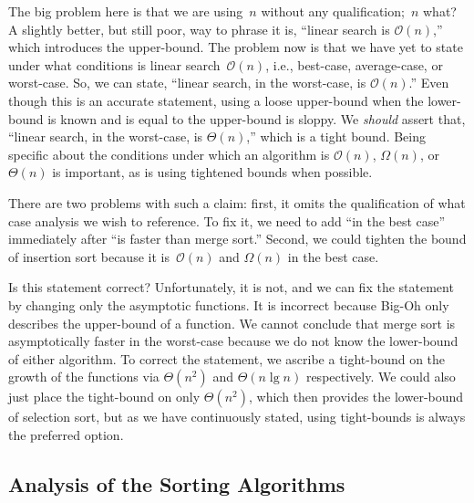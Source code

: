 The big problem here is that we are using~$n$ without any qualification;~$n$ what? 
A slightly better, but still poor, way to phrase it is, ``linear search is $\mathcal{O}(n)$,'' which introduces the upper-bound. 
The problem now is that we have yet to state under what conditions is linear search~$\mathcal{O}(n)$, i.e., best-case, average-case, or worst-case. 
So, we can state, ``linear search, in the worst-case, is $\mathcal{O}(n)$.'' 
Even though this is an accurate statement, using a loose upper-bound when the lower-bound is known and is equal to the upper-bound is sloppy. 
We \emph{should} assert that, ``linear search, in the worst-case, is $\Theta(n)$,'' which is a tight bound. 
Being specific about the conditions under which an algorithm is $\mathcal{O}(n)$, $\Omega(n)$, or $\Theta(n)$ is important, as is using tightened bounds when possible.

There are two problems with such a claim: first, it omits the qualification of what case analysis we wish to reference. 
To fix it, we need to add ``in the best case'' immediately after ``is faster than merge sort.'' 
Second, we could tighten the bound of insertion sort because it is~$\mathcal{O}(n)$ and $\Omega(n)$ in the best case.

Is this statement correct? 
Unfortunately, it is not, and we can fix the statement by changing only the asymptotic functions. 
It is incorrect because Big-Oh only describes the upper-bound of a function. 
We cannot conclude that merge sort is asymptotically faster in the worst-case because we do not know the lower-bound of either algorithm. 
To correct the statement, we ascribe a tight-bound on the growth of the functions via $\Theta(n^2)$ and $\Theta(n\lg{n})$ respectively. 
We could also just place the tight-bound on only $\Theta(n^2)$, which then provides the lower-bound of selection sort, but as we have continuously stated, using tight-bounds is always the preferred option.

\subsection{Analysis of the Sorting Algorithms}

